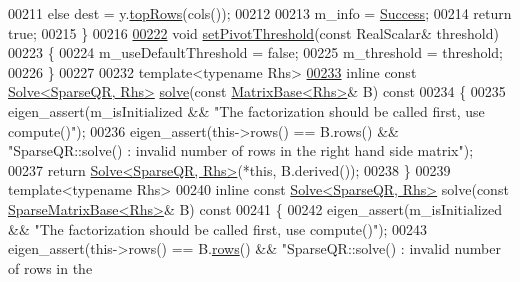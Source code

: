 \begin{DoxyCode}
00211       \textcolor{keywordflow}{else}                  dest = y.\hyperlink{group___core___module_ad3e01f9216955704228eaeac0b442d24}{topRows}(cols());
00212       
00213       m\_info = \hyperlink{group__enums_gga85fad7b87587764e5cf6b513a9e0ee5ea52581b035f4b59c203b8ff999ef5fcea}{Success};
00214       \textcolor{keywordflow}{return} \textcolor{keyword}{true};
00215     \}
00216 
\hyperlink{group___sparse_q_r___module_adb7bfa65f99e3ef91ed58ea663a850a1}{00222}     \textcolor{keywordtype}{void} \hyperlink{group___sparse_q_r___module_adb7bfa65f99e3ef91ed58ea663a850a1}{setPivotThreshold}(\textcolor{keyword}{const} RealScalar& threshold)
00223     \{
00224       m\_useDefaultThreshold = \textcolor{keyword}{false};
00225       m\_threshold = threshold;
00226     \}
00227     
00232     \textcolor{keyword}{template}<\textcolor{keyword}{typename} Rhs>
\hyperlink{group___sparse_q_r___module_aea13a2c6823cd8408ba49afde9b3d4e4}{00233}     \textcolor{keyword}{inline} \textcolor{keyword}{const} \hyperlink{group___core___module_class_eigen_1_1_solve}{Solve<SparseQR, Rhs>} \hyperlink{group___sparse_q_r___module_aea13a2c6823cd8408ba49afde9b3d4e4}{solve}(\textcolor{keyword}{const} 
      \hyperlink{group___core___module_class_eigen_1_1_matrix_base}{MatrixBase<Rhs>}& B)\textcolor{keyword}{ const }
00234 \textcolor{keyword}{    }\{
00235       eigen\_assert(m\_isInitialized && \textcolor{stringliteral}{"The factorization should be called first, use compute()"});
00236       eigen\_assert(this->rows() == B.rows() && \textcolor{stringliteral}{"SparseQR::solve() : invalid number of rows in the right
       hand side matrix"});
00237       \textcolor{keywordflow}{return} \hyperlink{group___core___module_class_eigen_1_1_solve}{Solve<SparseQR, Rhs>}(*\textcolor{keyword}{this}, B.derived());
00238     \}
00239     \textcolor{keyword}{template}<\textcolor{keyword}{typename} Rhs>
00240     \textcolor{keyword}{inline} \textcolor{keyword}{const} \hyperlink{group___core___module_class_eigen_1_1_solve}{Solve<SparseQR, Rhs>} solve(\textcolor{keyword}{const} 
      \hyperlink{group___sparse_core___module_class_eigen_1_1_sparse_matrix_base}{SparseMatrixBase<Rhs>}& B)\textcolor{keyword}{ const}
00241 \textcolor{keyword}{    }\{
00242           eigen\_assert(m\_isInitialized && \textcolor{stringliteral}{"The factorization should be called first, use compute()"});
00243           eigen\_assert(this->rows() == B.\hyperlink{group___sparse_core___module_a1944e9fa9ce7937bfc3a87b2cb94371f}{rows}() && \textcolor{stringliteral}{"SparseQR::solve() : invalid number of rows in the
}
\end{DoxyCode}
